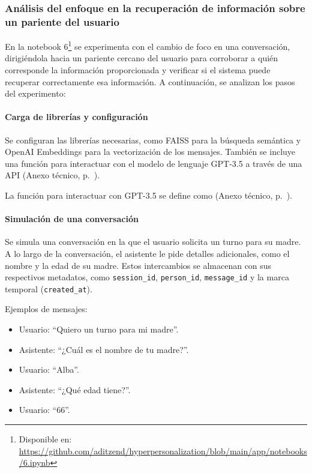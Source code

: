 \subsubsection{Análisis del enfoque en la recuperación de información sobre un pariente del usuario}

En la notebook 6\footnote{Disponible en: \url{https://github.com/aditzend/hyperpersonalization/blob/main/app/notebooks/6.ipynb}} se experimenta con el cambio de foco en una conversación, dirigiéndola hacia un pariente cercano del usuario para corroborar a quién corresponde la información proporcionada y verificar si el sistema puede recuperar correctamente esa información. A continuación, se analizan los pasos del experimento:

\paragraph{Carga de librerías y configuración}

Se configuran las librerías necesarias, como FAISS para la búsqueda semántica y OpenAI Embeddings para la vectorización de los mensajes. También se incluye una función para interactuar con el modelo de lenguaje GPT-3.5 a través de una API (Anexo técnico, p.~\pageref{anexo:code-4-1-6-1}).

La función para interactuar con GPT-3.5 se define como (Anexo técnico, p.~\pageref{anexo:code-4-1-6-2}).

\paragraph{Simulación de una conversación}

Se simula una conversación en la que el usuario solicita un turno para su madre. A lo largo de la conversación, el asistente le pide detalles adicionales, como el nombre y la edad de su madre. Estos intercambios se almacenan con sus respectivos metadatos, como \texttt{session\_id}, \texttt{person\_id}, \texttt{message\_id} y la marca temporal (\texttt{created\_at}).

Ejemplos de mensajes:
\begin{itemize}
    \item Usuario: ``Quiero un turno para mi madre''.
    \item Asistente: ``¿Cuál es el nombre de tu madre?''.
    \item Usuario: ``Alba''.
    \item Asistente: ``¿Qué edad tiene?''.
    \item Usuario: ``66''.
\end{itemize}

